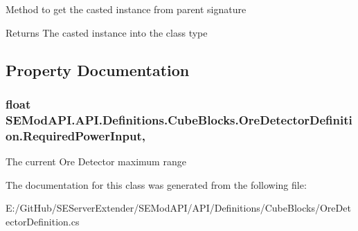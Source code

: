 Method to get the casted instance from parent signature 

\begin{DoxyReturn}{Returns}
The casted instance into the class type
\end{DoxyReturn}


\subsection{Property Documentation}
\hypertarget{class_s_e_mod_a_p_i_1_1_a_p_i_1_1_definitions_1_1_cube_blocks_1_1_ore_detector_definition_a0039f6aa57363a5c6100c3cba407d56a}{}
\subsubsection[{Required\+Power\+Input}]{\setlength{\rightskip}{0pt plus 5cm}float S\+E\+Mod\+A\+P\+I.\+A\+P\+I.\+Definitions.\+Cube\+Blocks.\+Ore\+Detector\+Definition.\+Required\+Power\+Input\hspace{0.3cm}{\ttfamily [get]}, {\ttfamily [set]}}\label{class_s_e_mod_a_p_i_1_1_a_p_i_1_1_definitions_1_1_cube_blocks_1_1_ore_detector_definition_a0039f6aa57363a5c6100c3cba407d56a}


The current Ore Detector maximum range 



The documentation for this class was generated from the following file\+:\begin{DoxyCompactItemize}
\item 
E\+:/\+Git\+Hub/\+S\+E\+Server\+Extender/\+S\+E\+Mod\+A\+P\+I/\+A\+P\+I/\+Definitions/\+Cube\+Blocks/Ore\+Detector\+Definition.\+cs\end{DoxyCompactItemize}
